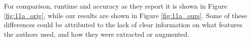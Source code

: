For comparison, runtime and accuracy as they report it is shown in Figure \ref{fig:11a_orig}, while our results are shown in Figure \ref{fig:11a_ours}. Some of these differences could be attributed to the lack of clear information on what features the authors used, and how they were extracted or augmented.



